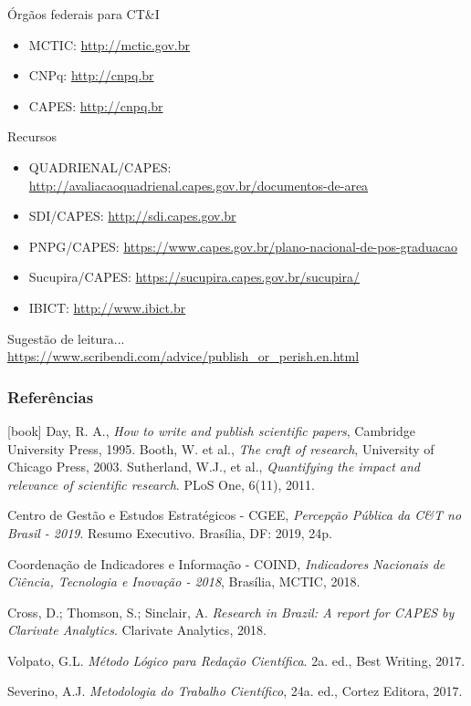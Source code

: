 \begin{frame}{Órgãos federais para CT{\&I}}
\begin{itemize}
\item MCTIC: \url{http://mctic.gov.br}
\item CNPq: \url{http://cnpq.br}
\item CAPES: \url{http://cnpq.br}
\end{itemize}
\end{frame}

\begin{frame}{Recursos}
\begin{itemize}
\item QUADRIENAL/CAPES: \url{http://avaliacaoquadrienal.capes.gov.br/documentos-de-area}
\item SDI/CAPES: \url{http://sdi.capes.gov.br}
\item PNPG/CAPES: \url{https://www.capes.gov.br/plano-nacional-de-pos-graduacao}
\item Sucupira/CAPES: \url{https://sucupira.capes.gov.br/sucupira/}
\item IBICT: \url{http://www.ibict.br}
\end{itemize}
\end{frame}


\begin{frame}{Sugestão de leitura...}
\url{https://www.scribendi.com/advice/publish_or_perish.en.html}
\end{frame}

\begin{frame}[allowframebreaks]
\frametitle{Referências}
\begin{thebibliography}{9}
[book]
%
 Day, R. A., \textit{How to write and publish scientific papers}, Cambridge University Press, 1995.
%
 Booth, W. et al., \textit{The craft of research}, University of Chicago Press, 2003.
%
 Sutherland, W.J., et al., \textit{Quantifying the impact and relevance of scientific research}. PLoS One, 6(11), 2011.

 Centro de Gestão e Estudos Estratégicos - CGEE, \textit{Percepção Pública da C{\&}T no Brasil - 2019}. Resumo Executivo. Brasília, DF: 2019, 24p.

 Coordenação de Indicadores e Informação - COIND, \textit{Indicadores Nacionais de Ciência, Tecnologia e Inovação - 2018}, Brasília, MCTIC, 2018.

 Cross, D.; Thomson, S.; Sinclair, A. \textit{Research in Brazil: A report for CAPES by Clarivate Analytics}. Clarivate Analytics, 2018.

Volpato, G.L. \textit{Método Lógico para Redação Científica}. 2a. ed., Best Writing, 2017.

Severino, A.J. \textit{Metodologia do Trabalho Científico}, 24a. ed., Cortez Editora, 2017.


\end{thebibliography}
\end{frame}